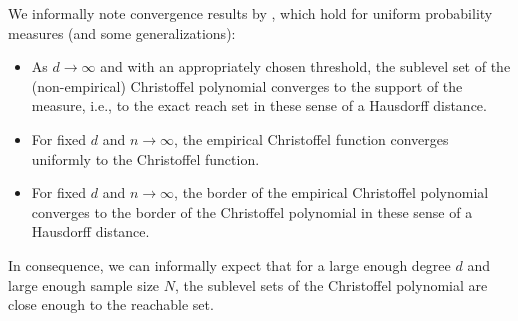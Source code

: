 \documentclass[pmlr]{jmlr}%
\begin{document}
We informally note convergence results by \cite{lasserre2019empirical}, which hold for uniform probability measures (and some generalizations):
\begin{itemize}
\itemsep=0ex
    \item As $d\rightarrow \infty$ and with an appropriately chosen threshold, the sublevel set of the (non-empirical) Christoffel polynomial converges to the support of the measure, i.e., to the exact reach set in these sense of a Hausdorff distance.
    \item For fixed $d$ and $n\rightarrow \infty$, the empirical Christoffel function converges uniformly to the Christoffel function.
    \item For fixed $d$ and $n\rightarrow \infty$, the border of the empirical Christoffel polynomial converges to the border of the Christoffel polynomial in these sense of a Hausdorff distance. 
\end{itemize}
%
In consequence, we can informally expect that for a large enough degree $d$ and large enough sample size $N$, the sublevel sets of the Christoffel polynomial are close enough to the reachable set.
\end{document}
